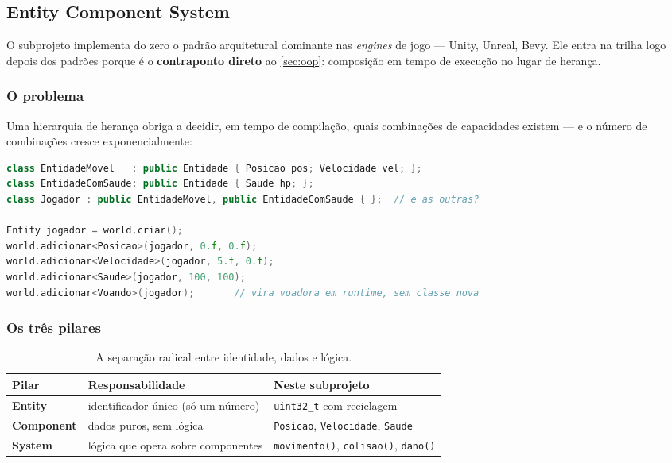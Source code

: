 \subsection{Entity Component System}
\label{sec:ecs}

O subprojeto  implementa do zero o padrão arquitetural dominante
nas \emph{engines} de jogo --- Unity, Unreal, Bevy. Ele entra na trilha logo
depois dos padrões porque é o \textbf{contraponto direto} ao \cref{sec:oop}:
composição em tempo de execução no lugar de herança.

\subsubsection{O problema}

Uma hierarquia de herança obriga a decidir, em tempo de compilação, quais
combinações de capacidades existem --- e o número de combinações cresce
exponencialmente:

\begin{lstlisting}[style=bt, language=C++,
    caption={A explosão combinatória, e a alternativa.}]
class EntidadeMovel   : public Entidade { Posicao pos; Velocidade vel; };
class EntidadeComSaude: public Entidade { Saude hp; };
class Jogador : public EntidadeMovel, public EntidadeComSaude { };  // e as outras?

Entity jogador = world.criar();
world.adicionar<Posicao>(jogador, 0.f, 0.f);
world.adicionar<Velocidade>(jogador, 5.f, 0.f);
world.adicionar<Saude>(jogador, 100, 100);
world.adicionar<Voando>(jogador);       // vira voadora em runtime, sem classe nova
\end{lstlisting}

\subsubsection{Os três pilares}

\begin{table}[htbp]
\centering
\caption{A separação radical entre identidade, dados e lógica.}
\label{tab:ecs-pilares}
\footnotesize
\begin{tabular}{@{}lll@{}}
\toprule
\textbf{Pilar} & \textbf{Responsabilidade} & \textbf{Neste subprojeto} \\
\midrule
\textbf{Entity}    & identificador único (só um número) & \texttt{uint32\_t} com reciclagem \\
\textbf{Component} & dados puros, sem lógica            & \texttt{Posicao}, \texttt{Velocidade}, \texttt{Saude} \\
\textbf{System}    & lógica que opera sobre componentes & \texttt{movimento()}, \texttt{colisao()}, \texttt{dano()} \\
\bottomrule
\end{tabular}
\end{table}

